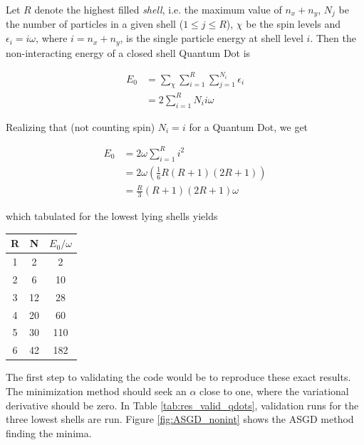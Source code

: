 Let $R$ denote the highest filled \textit{shell}, i.e. the maximum value of $n_x + n_y$, $N_j$ be the number of particles in a given shell ($1\le j\le R$), $\chi$ be the spin levels and $\epsilon_i = i\omega$, where $i=n_x + n_y$, is the single particle energy at shell level $i$. Then the non-interacting energy of a closed shell Quantum Dot is

\begin{align}
 E_0 &= \sum_\chi\sum_{i=1}^R\sum_{j=1}^{N_i} \epsilon_i \\
     &= 2\sum_{i=1}^R N_i i \omega 
\end{align}

Realizing that (not counting spin) $N_i = i$ for a Quantum Dot, we get

\begin{align}
 E_0 &= 2\omega\sum_{i=1}^R i^2 \\
     &= 2\omega \left(\frac{1}{6}R(R+1)(2R + 1)\right) \\
     &= \frac{R}{3}(R + 1)(2R + 1)\omega
\end{align}

which tabulated for the lowest lying shells yields

\begin{center}
 \begin{tabular}{cc|c}
 R & N  & $E_0/\omega$ \\
 \hline
 1 & 2  & 2  \\
 2 & 6  & 10 \\
 3 & 12 & 28 \\
 4 & 20 & 60 \\
 5 & 30 & 110\\
 6 & 42 & 182\\
 \end{tabular}
\end{center}

The first step to validating the code would be to reproduce these exact results. The minimization method should seek an $\alpha$ close to one, where the variational derivative should be zero. In Table \ref{tab:res_valid_qdots}, validation runs for the three lowest shells are run. Figure \ref{fig:ASGD_nonint} shows the ASGD method finding the minima.


